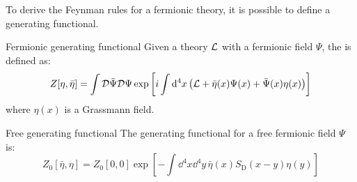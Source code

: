 To derive the Feynman rules for a fermionic theory, it is possible to define a generating functional.

\begin{definition}{Fermionic generating functional}{}
  Given a theory $ \mathcal{L} $ with a fermionic field $ \Psi $, the  is defined as:
  \begin{equation}
    Z[\eta,\bar{\eta}] = \int \mathcal{D}\bar{\Psi} \mathcal{D}\Psi \exp \left[ i \int \mathrm{d}^4x \left( \mathcal{L} + \bar{\eta}(x) \Psi(x) + \bar{\Psi}(x) \eta(x) \right) \right]
    \label{eq:gen-func-ferm}
  \end{equation}
  where $ \eta(x) $ is a Grassmann field.
\end{definition}

\begin{proposition}{Free generating functional}{}
  The generating functional for a free fermionic field $ \Psi $ is:
  \begin{equation}
    Z_0[\bar{\eta},\eta] = Z_0[0,0] \exp \left[ - \int \dd^4x \dd^4y\, \bar{\eta}(x) S_\text{D}(x-y) \eta(y) \right]
  \end{equation}
\end{proposition}

